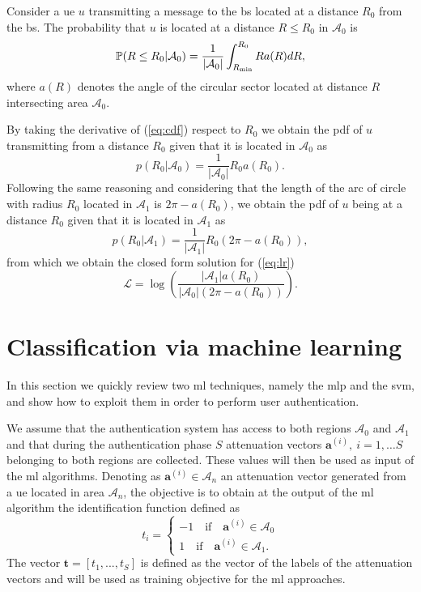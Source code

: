 \documentclass[twocolumns]{IEEEtran}
\begin{document}
Consider a \ac{ue} $u$ transmitting a message to the \ac{bs} located at a distance $R_0$ from the \ac{bs}. The probability that $u$ is located at a distance $R\le R_0$ in $\mathcal{A}_0$ is
\begin{equation}\label{eq:cdf}
     \mathbb{P}(R \le R_0|\mathcal{A}_0) = \frac{1}{|\mathcal{A}_0|}\int_{R_{\rm min}}^{R_0} R a(R) dR,
\end{equation}
where $a(R)$ denotes the angle of the circular sector located at distance $R$ intersecting area $\mathcal{A}_0$.

By taking the derivative of (\ref{eq:cdf}) respect to $R_0$ we obtain the \ac{pdf} of $u$ transmitting from a distance $R_0$ given that it is located in $\mathcal{A}_0$ as
\begin{equation}
    p(R_0|\mathcal{A}_0) = \frac{1}{|\mathcal{A}_0|}R_0a(R_0).
\end{equation}
Following the same reasoning and considering that the length of the arc of circle with radius $R_0$ located in $\mathcal{A}_1$ is $2\pi - a(R_0)$, we obtain the \ac{pdf} of $u$ being at a distance $R_0$ given that it is located in $\mathcal{A}_1$ as
\begin{equation}
     p(R_0|\mathcal{A}_1) = \frac{1}{|\mathcal{A}_1|}R_0\left(2\pi-a(R_0)\right),
\end{equation}
from which we obtain the closed form solution for (\ref{eq:lr}) 
\begin{equation}
    \mathcal{L}=\log\left(\frac{|\mathcal{A}_1|a(R_0)}{|\mathcal{A}_0|\left(2\pi-a(R_0)\right)}\right).
\end{equation}

\section{Classification via machine learning}
In this section we quickly review two \ac{ml} techniques, namely the \ac{mlp} and the \ac{svm}, and show how to exploit them in order to perform user authentication.

We assume that the authentication system has access to both regions $\mathcal{A}_0$ and $\mathcal{A}_1$ and that during the authentication phase $S$ attenuation vectors $\bm{a}^{(i)}, \ i=1,\dots S$  belonging to both regions are collected. These values will then be used as input of the \ac{ml} algorithms. Denoting as $\bm{a}^{(i)}\in \mathcal{A}_n$ an attenuation vector generated from a \ac{ue} located in area $\mathcal{A}_{n}$, the objective is to obtain at the output of the \ac{ml} algorithm the identification function defined as
\begin{equation}
  t_i =
  \begin{cases}
  -1 \quad \text{if} \quad \bm{a}^{(i)} \in \mathcal{A}_0\\
  1 \quad \text{if} \quad \bm{a}^{(i)} \in \mathcal{A}_1.
  \end{cases}
\end{equation}
The vector $\bm{t}=[t_1,...,t_S]$ is defined as the vector of the labels of the attenuation vectors and will be used as training objective for the \ac{ml} approaches.
\end{document}
